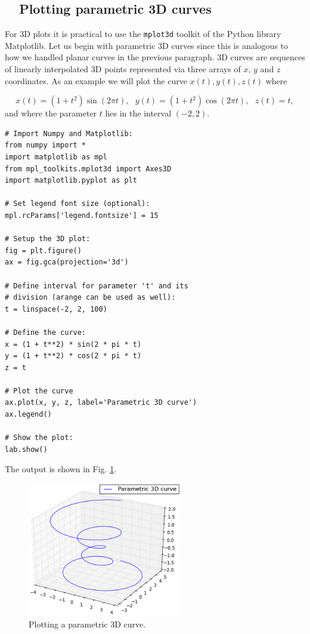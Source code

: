 \subsection{\ \ Plotting parametric 3D curves}

For 3D plots it is practical to use the {\tt mplot3d} toolkit of the 
Python library Matplotlib. Let us begin with 
parametric 3D curves since this is analogous to how we handled planar curves in 
the previous paragraph. 3D curves are sequences of linearly interpolated 3D points
represented via three arrays of $x$, $y$ and $z$ coordinates. As an 
example we will plot the curve $x(t), y(t), z(t)$ where

$$
x(t) = (1 + t^2) \sin(2 \pi t), \ \ \ y(t) = (1 + t^2) \cos(2 \pi t), \ \ \ z(t) = t,
$$
and where the parameter $t$ lies in the interval $(-2, 2)$.

\begin{verbatim}
# Import Numpy and Matplotlib:
from numpy import *
import matplotlib as mpl
from mpl_toolkits.mplot3d import Axes3D
import matplotlib.pyplot as plt

# Set legend font size (optional):
mpl.rcParams['legend.fontsize'] = 15

# Setup the 3D plot:
fig = plt.figure()
ax = fig.gca(projection='3d')

# Define interval for parameter 't' and its
# division (arange can be used as well):
t = linspace(-2, 2, 100)

# Define the curve:
x = (1 + t**2) * sin(2 * pi * t)
y = (1 + t**2) * cos(2 * pi * t)
z = t

# Plot the curve
ax.plot(x, y, z, label='Parametric 3D curve')
ax.legend()

# Show the plot:
lab.show()
\end{verbatim}
The output is shown in Fig. \ref{fig:plot3d-1}.

\begin{figure}[!ht]
\begin{center}
\includegraphics[width=0.6\textwidth]{imgp/plot3d-1.png}
\end{center}
\vspace{-4mm}
\caption{Plotting a parametric 3D curve.}
\label{fig:plot3d-1}
\end{figure}


